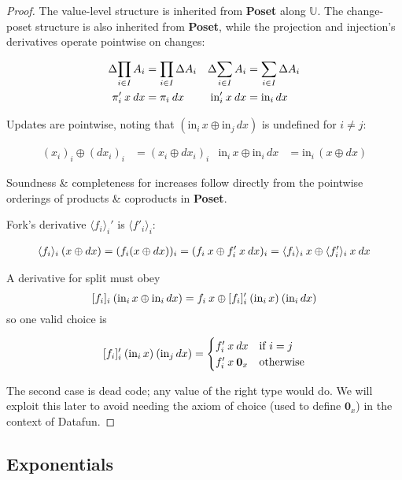 \documentclass{rntz}\usepackage[a5]{rntzgeometry}\usepackage[fullwidth=130mm,width=330pt,]{narrow}
\newcommand\mathvar[1]{\ensuremath{#1}} %
\newcommand\cat\textbf
\newcommand\Poset{\cat{Poset}}
\newcommand\D\Delta
\newcommand\injc{\text{in}}
\newcommand\inj[1]{\injc_{#1}\,}
\newcommand\zero{\ensuremath{\mathbold{0}}}
\newcommand\<{\mskip 4mu plus 4mu minus 1mu}
\newcommand\dx{\mathvar{dx}}
\newcommand\valfn{\ensuremath{\mathbb{U}}}
\newcommand\chgs[1]{\D{#1}}
\newcommand\deriv[1]{\ensuremath{#1'}}
\newcommand\upd{\mathbin{\oplus}}
\newcommand\fork[1]{\langle{#1}\rangle}
\newcommand\krof[1]{[{#1}]}
\begin{document}
\begin{proof}
  The value-level structure is inherited from \Poset{} along \valfn{}. The
  change-poset structure is also inherited from \Poset{}, while the projection
  and injection's derivatives operate pointwise on changes:

  \begin{align*}
    \chgs{\prod_{i \in I} A_i} &= \prod_{i \in I} \chgs A_i &
    \chgs{\sum_{i \in I} A_i} &= \sum_{i \in I} \chgs A_i
    \\
    \deriv\pi_i\<x\<\dx &= \pi_i\<\dx & \deriv\injc_i\<x\<\dx &= \inj i \dx
  \end{align*}

  \noindent Updates are pointwise, noting that $(\inj i x \upd \inj j \dx)$ is
  undefined for $i \ne j$:

  \begin{align*}
    (x_i)_i \upd (\dx_i)_i &= (x_i \upd \dx_i)_i &
    \inj i x \upd \inj i \dx &= \inj i (x \upd \dx)
  \end{align*}

  \noindent
  Soundness \& completeness for increases follow directly from the pointwise
  orderings of products \& coproducts in \Poset{}.

  Fork's derivative $\deriv{\fork{f_i}_i}$ is $\fork{\deriv f_i}_i$:

  \begin{gather*}
    \fork{f_i}_i \<(x \upd \dx)
    = (f_i(x \upd \dx))_i
    = (f_i\<x \upd \deriv f_i \<x \<\dx)_i
    = \fork{f_i}_i \<x \upd \fork{\deriv f_i}_i \<x \<\dx
  \end{gather*}

  \noindent
  A derivative for split must obey \[ \krof{f_i}_i\<(\inj i x \upd \inj i \dx)
  = f_i\<x \upd \deriv{\krof{f_i}_i} \<(\inj i x) \<(\inj i \dx) \] so one
  valid choice is

  \[\deriv{\krof{f_i}_i} \<(\inj i x) \<(\inj j \dx)
  =
  \begin{cases}
    \deriv f_i \<x \<\dx & \text{if}~i = j\\
    \deriv f_i \<x \<\zero_x & \text{otherwise}
  \end{cases}
  \]

  \noindent
  The second case is dead code; any value of the right type would do. We will
  exploit this later to avoid needing the axiom of choice (used to define
  $\zero_x$) in the context of Datafun.
\end{proof}


\subsection{Exponentials}
\end{document}
